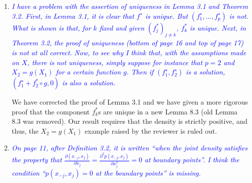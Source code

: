 \documentclass[pdftex,12pt]{article}
\def\E{{\mathbb E}}
\def\rc#1{{\it\textcolor{blue}{#1}}\smallskip}
\begin{document}
\begin{enumerate}
\item \rc{I have a problem with the assertion of
  uniqueness in Lemma 3.1 and Theorem 3.2. First, in Lemma 3.1, it is
  clear that $f^∗$ is unique. But $(f_1^∗, \ldots, f_p^∗)$ is not. What is
  shown is that, for $k$ fixed and given $(f_j^*)_{j\neq k}$, $f_k^*$ is unique. Next,
  in Theorem 3.2, the proof of uniqueness (bottom of page 16 and top
  of page 17) is not at all correct.
   Now, to see why I think that, with the assumptions made on $X$, there is
   not uniqueness, simply suppose for instance that $p = 2$ and $X_2 = g(X_1)$
   for a certain function $g$. Then if $(f_1^∗, f_2^∗)$ is a solution,
   $(f_1^∗ + f_2^* \circ g, 0)$ is also a solution.}


We have corrected the proof of Lemma 3.1 and we have given a more
rigorous proof that the component $f^*_k$s are unique in a new Lemma
8.3 (old Lemma 8.3 was removed). Our result requires that the density
is strictly positive, and thus, the $X_2 = g(X_1)$ example raised by the
reviewer is ruled out.







\item \rc{On page 11, after Definition 3.2, it is written ``when the joint
density satisfies the property that
$\frac{\partial(x_{-j},x_j)}{\partial x_j} = \frac{\partial^2 p(x_{-j},
  x_j)}{\partial x_j^2} = 0$ at boundary points''.
I think the condition ``$p(x_{−j}, x_j ) = 0$ at the boundary points'' is
missing.}


\end{enumerate}
\end{document}

